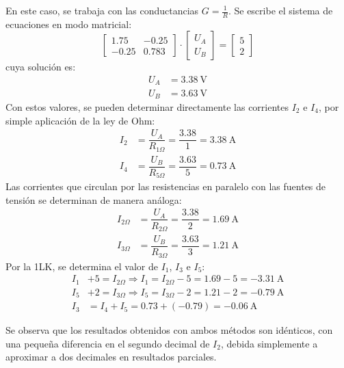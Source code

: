 En este caso, se trabaja con las conductancias $G=\frac{1}{R}$. Se
escribe el sistema de ecuaciones en modo matricial:
\begin{equation*}
  \begin{bmatrix}
    1.75 & - 0.25\\
    -0.25 & 0.783
  \end{bmatrix} \cdot%
  \begin{bmatrix}
    U_A\\
    U_B
  \end{bmatrix} = %
  \begin{bmatrix}
    5\\
    2
  \end{bmatrix}
\end{equation*}
cuya solución es:
\begin{align*}
  U_A&=\qty{3.38}{\volt}\\
  U_B&=\qty{3.63}{\volt}
\end{align*}
Con estos valores, se pueden determinar directamente las corrientes
$I_2$ e $I_4$, por simple aplicación de la ley de Ohm:
\begin{align*}
  I_2&=\dfrac{U_A}{R_{1\Omega}}=\dfrac{3.38}{1}=\qty{3.38}{\ampere}\\
  I_4&=\dfrac{U_B}{R_{5\Omega}}=\dfrac{3.63}{5}=\qty{0.73}{\ampere}
\end{align*}
Las corrientes que circulan por las resistencias en paralelo con las
fuentes de tensión se determinan de manera análoga:
\begin{align*}
  I_{2\Omega}&=\dfrac{U_A}{R_{2\Omega}}=\dfrac{3.38}{2}=\qty{1.69}{\ampere}\\
  I_{3\Omega}&=\dfrac{U_B}{R_{3\Omega}}=\dfrac{3.63}{3}=\qty{1.21}{\ampere}
\end{align*}
Por la 1LK, se determina el valor de $I_1$, $I_3$ e $I_5$:
\begin{align*}
  I_1&+5=I_{2\Omega}\Rightarrow I_1=I_{2\Omega}-5=1.69-5=\qty{-3.31}{\ampere}\\
  I_5&+2=I_{3\Omega}\Rightarrow I_5=I_{3\Omega}-2=1.21-2=\qty{-0.79}{\ampere}\\
  I_3&=I_4+I_5=0.73+(-0.79)=\qty{-0.06}{\ampere}
\end{align*}

Se observa que los resultados obtenidos con ambos métodos son
idénticos, con una pequeña diferencia en el segundo decimal de $I_2$, debida simplemente a aproximar a dos decimales en resultados parciales.

